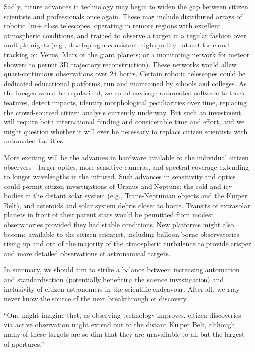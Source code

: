 \documentclass{ar2e}
\begin{document}
Sadly, future advances in technology may begin to widen the gap between
citizen scientists and professionals once again. These may include distributed
arrays of robotic 1m+ class telescopes, operating in remote regions with
excellent atmospheric conditions, and trained to observe a target in a regular
fashion over multiple nights (e.g., developing a consistent high-quality
dataset for cloud tracking on Venus, Mars or the giant planets; or a
monitoring network for meteor showers to permit 3D trajectory
reconstruction).  These networks would allow quasi-continuous observations
over 24 hours.  Certain robotic telescopes could be dedicated educational
platforms, run and maintained by schools and colleges.  As the images would be
regularised, we could envisage automated software to track features, detect
impacts, identify morphological peculiarities over time, replacing the
crowd-sourced citizen analysis currently underway.  But such an investment
will require both international funding and considerable time and effort, and
we might question whether it will ever be necessary to replace citizen
scientists with automated facilities.

More exciting will be the advances in hardware available to the individual
citizen observers - larger optics, more sensitive cameras, and spectral
coverage extending to longer wavelengths in the infrared.  Such advances in
sensitivity and optics could permit citizen investigations of Uranus and
Neptune; the cold and icy bodies in the distant solar system (e.g.,
Trans-Neptunian objects and the Kuiper Belt), and asteroids and solar system
debris closer to home.  Transits of extrasolar planets in front of their
parent stars would be permitted from modest observatories provided they had
stable conditions.  New platforms might also become available to the citizen
scientist, including balloon-borne observatories rising up and out of the
majority of the atmospheric turbulence to provide crisper and more detailed
observations of astronomical targets. 

In summary, we should aim to strike a balance between increasing automation
and standardisation (potentially benefiting the science investigation) and
inclusivity of citizen astronomers in the scientific endeavour.  After all, we
may never know the source of the next breakthrough or discovery.


``One might imagine that, as observing technology improves, citizen discoveries
via active observation might extend out to the distant Kuiper Belt, although
many of these targets are so dim that they are unavailable to all but the
largest of apertures.'' 
\end{document}
